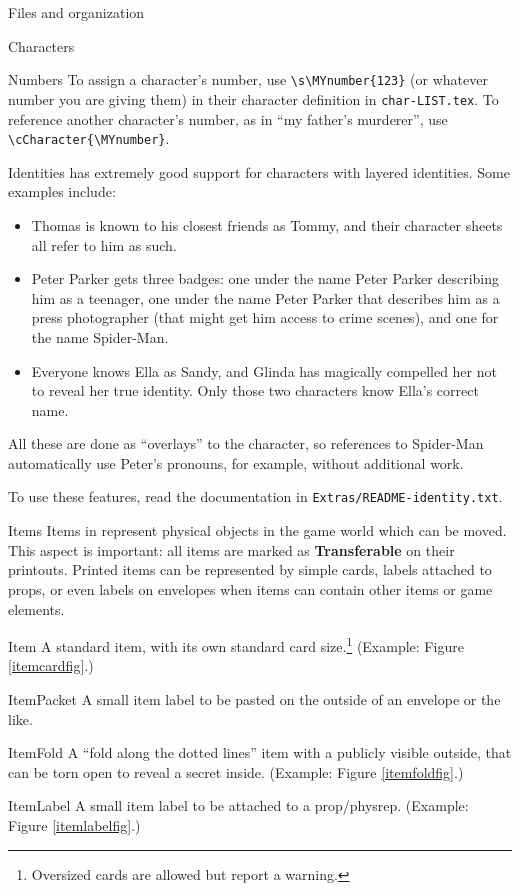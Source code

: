 \documentclass[sheet]{GameTexBase}
\begin{document}
\begin{section}{Files and organization}
\begin{subsection}{Characters}
\begin{subsubsection}{Numbers}
To assign a character's number, use \lstinline|\s\MYnumber{123}| (or whatever number you are giving them) in their character definition in \lstinline|char-LIST.tex|.
To reference another character's number, as in ``my father's murderer'', use \lstinline|\cCharacter{\MYnumber}|.
\end{subsubsection}
\begin{subsubsection}{Identities}
\label{identities}
\gametex{} has extremely good support for characters with layered identities.  Some examples include:
\begin{itemize}
\item Thomas is known to his closest friends as Tommy, and their character sheets all refer to him as such.
\item Peter Parker gets three badges: one under the name Peter Parker describing him as a teenager, one under the name Peter Parker that describes him as a press photographer (that might get him access to crime scenes), and one for the name Spider-Man.
\item Everyone knows Ella as Sandy, and Glinda has magically compelled her not to reveal her true identity.  Only those two characters know Ella's correct name.
\end{itemize}
All these are done as ``overlays'' to the character, so references to Spider-Man automatically use Peter's pronouns, for example, without additional work.

To use these features, read the documentation in \lstinline|Extras/README-identity.txt|.
\end{subsubsection}
\end{subsection}
\begin{subsection}{Items}
Items in \gametex{} represent physical objects in the game world which can be moved.  This aspect is important: all items are marked as \textbf{Transferable} on their printouts.
Printed \gametex{} items can be represented by simple cards, labels attached to props, or even labels on envelopes when items can contain other items or game elements.

\begin{desc}
\item[Item] A standard item, with its own standard card size.\footnote{Oversized cards are allowed but report a warning.} (Example: Figure \ref{itemcardfig}.)
\item[ItemPacket] A small item label to be pasted on the outside of an envelope or the like.
\item[ItemFold] A ``fold along the dotted lines'' item with a publicly visible outside, that can be torn open to reveal a secret inside. (Example: Figure \ref{itemfoldfig}.)
\item[ItemLabel] A small item label to be attached to a prop/physrep. (Example: Figure \ref{itemlabelfig}.)
\end{desc}


\end{subsection}
\end{section}
\end{document}
